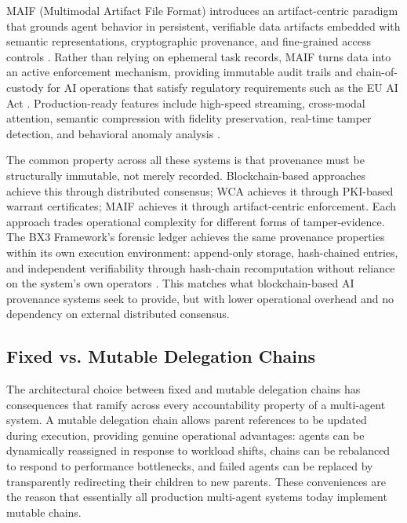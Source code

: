 \documentclass[11pt,oneside]{article}
\begin{document}
MAIF (Multimodal Artifact File Format) introduces an artifact-centric paradigm that grounds agent behavior in persistent, verifiable data artifacts embedded with semantic representations, cryptographic provenance, and fine-grained access controls \cite{maif2025arxiv}. Rather than relying on ephemeral task records, MAIF turns data into an active enforcement mechanism, providing immutable audit trails and chain-of-custody for AI operations that satisfy regulatory requirements such as the EU AI Act \cite{maif2025arxiv}. Production-ready features include high-speed streaming, cross-modal attention, semantic compression with fidelity preservation, real-time tamper detection, and behavioral anomaly analysis \cite{maif2025arxiv}.

The common property across all these systems is that provenance must be structurally immutable, not merely recorded. Blockchain-based approaches achieve this through distributed consensus; WCA achieves it through PKI-based warrant certificates; MAIF achieves it through artifact-centric enforcement. Each approach trades operational complexity for different forms of tamper-evidence. The BX3 Framework's forensic ledger achieves the same provenance properties within its own execution environment: append-only storage, hash-chained entries, and independent verifiability through hash-chain recomputation without reliance on the system's own operators \cite{bx3framework2026}. This matches what blockchain-based AI provenance systems seek to provide, but with lower operational overhead and no dependency on external distributed consensus.

\subsection{Fixed vs. Mutable Delegation Chains}\label{sec:fixed-v-mutable}

The architectural choice between fixed and mutable delegation chains has consequences that ramify across every accountability property of a multi-agent system. A mutable delegation chain allows parent references to be updated during execution, providing genuine operational advantages: agents can be dynamically reassigned in response to workload shifts, chains can be rebalanced to respond to performance bottlenecks, and failed agents can be replaced by transparently redirecting their children to new parents. These conveniences are the reason that essentially all production multi-agent systems today implement mutable chains.
\end{document}

